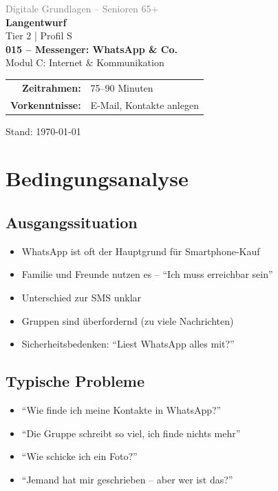 \documentclass[11pt,a4paper]{article}
\begin{document}
\begin{titlepage}
    \centering
    \vspace*{2cm}
    {\Large\textcolor{gray}{Digitale Grundlagen -- Senioren 65+}}\\[2cm]
    {\Huge\textcolor{fach}{\textbf{Langentwurf}}}\\[0.5cm]
    {\large Tier 2 | Profil S}\\[2cm]
    {\LARGE\textbf{015 -- Messenger: WhatsApp \& Co.}}\\[0.5cm]
    {\large Modul C: Internet \& Kommunikation}\\[2cm]
    \begin{tabular}{rl}
        \textbf{Zeitrahmen:} & 75--90 Minuten \\
        \textbf{Vorkenntnisse:} & E-Mail, Kontakte anlegen \\
    \end{tabular}
    \vfill
    {\normalsize Stand: \today}
\end{titlepage}

\tableofcontents
\newpage

\section{Bedingungsanalyse}

\subsection{Ausgangssituation}
\begin{itemize}
    \item WhatsApp ist oft der Hauptgrund für Smartphone-Kauf
    \item Familie und Freunde nutzen es -- ``Ich muss erreichbar sein''
    \item Unterschied zur SMS unklar
    \item Gruppen sind überfordernd (zu viele Nachrichten)
    \item Sicherheitsbedenken: ``Liest WhatsApp alles mit?''
\end{itemize}

\subsection{Typische Probleme}
\begin{itemize}
    \item ``Wie finde ich meine Kontakte in WhatsApp?''
    \item ``Die Gruppe schreibt so viel, ich finde nichts mehr''
    \item ``Wie schicke ich ein Foto?''
    \item ``Jemand hat mir geschrieben -- aber wer ist das?''
\end{itemize}
\end{document}
